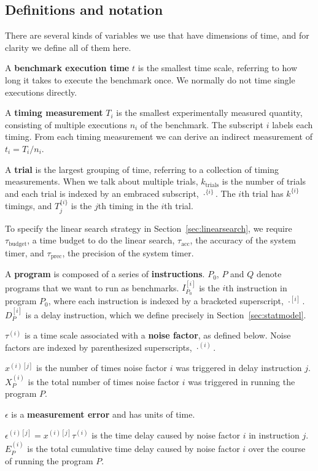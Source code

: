 \documentclass[conference]{IEEEtran}
\begin{document}
\subsection{Definitions and notation}

There are several kinds of variables we use that have dimensions of time, and for clarity we define all of them here.

A \textbf{benchmark execution time} $t$ is the smallest time scale, referring to how long it takes to execute the benchmark once. We normally do not time single executions directly.

A \textbf{timing measurement} $T_i$ is the smallest experimentally measured quantity, consisting of multiple executions $n_i$ of the benchmark. The subscript $i$ labels each timing. From each timing measurement we can derive an indirect measurement of $t_i = T_i/n_i$.

A \textbf{trial} is the largest grouping of time, referring to a collection of timing measurements. When we talk about multiple trials, $k_{\textrm{trials}}$ is the number of trials and each trial is indexed by an embraced subscript, $\cdot^{\{i\}}$. The $i$th trial has $k^{\{i\}}$ timings, and $T^{\{i\}}_j$ is the $j$th timing in the $i$th trial.

To specify the linear search strategy in Section~\ref{sec:linearsearch}, we require
$\tau_{\textrm{budget}}$, a time budget to do the linear search,
$\tau_{\textrm{acc}}$, the accuracy of the system timer, and
$\tau_{\textrm{prec}}$, the precision of the system timer.


A \textbf{program} is composed of a series of \textbf{instructions}. $P_0$, $P$ and $Q$ denote programs that we want to run as benchmarks. $I^{[i]}_{P_0}$ is the $i$th instruction in program $P_0$, where each instruction is indexed by a bracketed superscript, $\cdot^{[i]}$. $D^{[i]}_{P}$ is a delay instruction, which we define precisely in Section~\ref{sec:statmodel}.

$\tau^{(i)}$ is a time scale associated with a \textbf{noise factor}, as defined below. Noise factors are indexed by parenthesized superscripts, $\cdot^{(i)}$.

$x^{(i)[j]}$ is the number of times noise factor $i$ was triggered in delay instruction $j$. $X_P^{(i)}$ is the total number of times noise factor $i$ was triggered in running the program $P$.

$\epsilon$ is a \textbf{measurement error} and has units of time.

$\epsilon^{(i)[j]} = x^{(i)[j]} \tau^{(i)}$ is the time delay caused by noise factor $i$ in instruction $j$. $E_P^{(i)}$ is the total cumulative time delay caused by noise factor $i$ over the course of running the program $P$.
\end{document}
